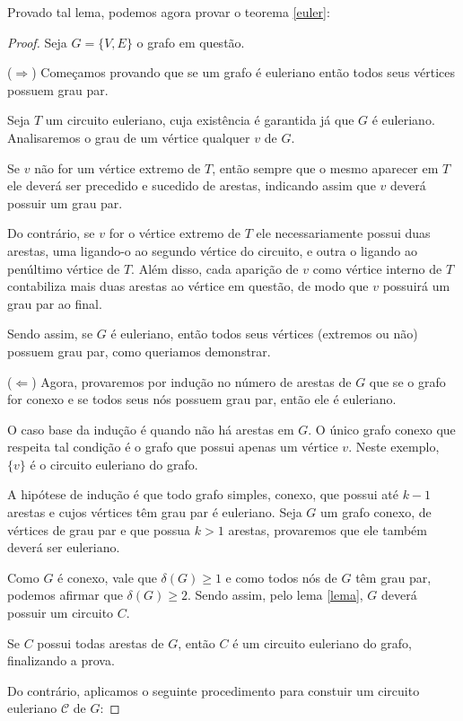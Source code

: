 Provado tal lema, podemos agora provar o teorema \ref{euler}:

\begin{proof}

Seja $G = \{V, E\}$ o grafo em questão.

($\Rightarrow$) Começamos provando que se um grafo é euleriano então todos seus vértices possuem grau par.

Seja $T$ um circuito euleriano, cuja existência é garantida já que $G$ é euleriano. Analisaremos o grau de um vértice qualquer $v$ de $G$.

Se $v$ não for um vértice extremo de $T$, então sempre que o mesmo aparecer em $T$ ele deverá ser precedido e sucedido de arestas, indicando assim que $v$ deverá possuir um grau par.

Do contrário, se $v$ for o vértice extremo de $T$ ele necessariamente possui duas arestas, uma ligando-o ao segundo vértice do circuito, e outra o ligando ao penúltimo vértice de $T$. 
Além disso, cada aparição de $v$ como vértice interno de $T$ contabiliza mais duas arestas ao vértice em questão, de modo que $v$ possuirá um grau par ao final.

Sendo assim, se $G$ é euleriano, então todos seus vértices (extremos ou não) possuem grau par, como queriamos demonstrar.

($\Leftarrow$) Agora, provaremos por indução no número de arestas de $G$ que se o grafo for conexo e se todos seus nós possuem grau par, então ele é euleriano.

O caso base da indução é quando não há arestas em $G$. 
O único grafo conexo que respeita tal condição é o grafo que possui apenas um vértice $v$.
Neste exemplo, $\{v\}$ é o circuito euleriano do grafo.

A hipótese de indução é que todo grafo simples, conexo, que possui até $k-1$ arestas e cujos vértices têm grau par é euleriano. 
Seja $G$ um grafo conexo, de vértices de grau par e que possua $k > 1$ arestas, provaremos que ele também deverá ser euleriano.

Como $G$ é conexo, vale que $\delta(G) \geq 1$ e como todos nós de $G$ têm grau par, podemos afirmar que $\delta(G) \geq 2$. 
Sendo assim, pelo lema \ref{lema}, $G$ deverá possuir um circuito $C$.

Se $C$ possui todas arestas de $G$, então $C$ é um circuito euleriano do grafo, finalizando a prova.

Do contrário, aplicamos o seguinte procedimento para constuir um circuito euleriano $\mathcal{C}$ de $G$:


\end{proof}
